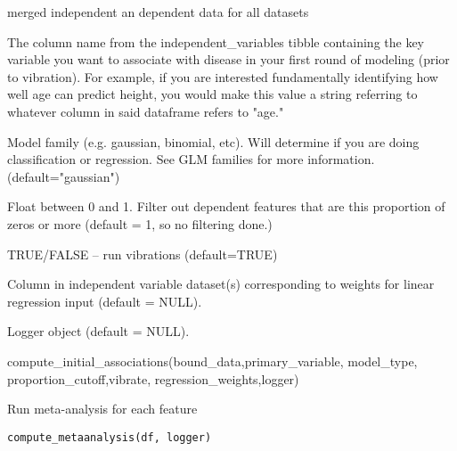 \documentclass[a4paper]{book}
\begin{document}
\begin{Arguments}
\begin{ldescription}
\item[\code{bound\_data}] merged independent an dependent data for all datasets

\item[\code{primary\_variable}] The column name from the independent\_variables tibble containing the key variable you want to associate with disease in your first round of modeling (prior to vibration). For example, if you are interested fundamentally identifying how well age can predict height, you would make this value a string referring to whatever column in said dataframe refers to "age."

\item[\code{model\_type}] Model family (e.g. gaussian, binomial, etc). Will determine if you are doing classification or regression. See GLM families for more information. (default="gaussian")

\item[\code{proportion\_cutoff}] Float between 0 and 1. Filter out dependent features that are this proportion of zeros or more (default = 1, so no filtering done.)

\item[\code{vibrate}] TRUE/FALSE -- run vibrations (default=TRUE)

\item[\code{regression\_weights}] Column in independent variable dataset(s) corresponding to weights  for linear regression input (default = NULL).

\item[\code{logger}] Logger object (default = NULL).
\end{ldescription}
\end{Arguments}
%
\begin{Examples}
\begin{ExampleCode}
compute_initial_associations(bound_data,primary_variable, model_type, proportion_cutoff,vibrate, regression_weights,logger)
\end{ExampleCode}
\end{Examples}
%
\begin{Description}\relax
Run meta-analysis for each feature
\end{Description}
%
\begin{Usage}
\begin{verbatim}
compute_metaanalysis(df, logger)
\end{verbatim}
\end{Usage}
\end{document}
